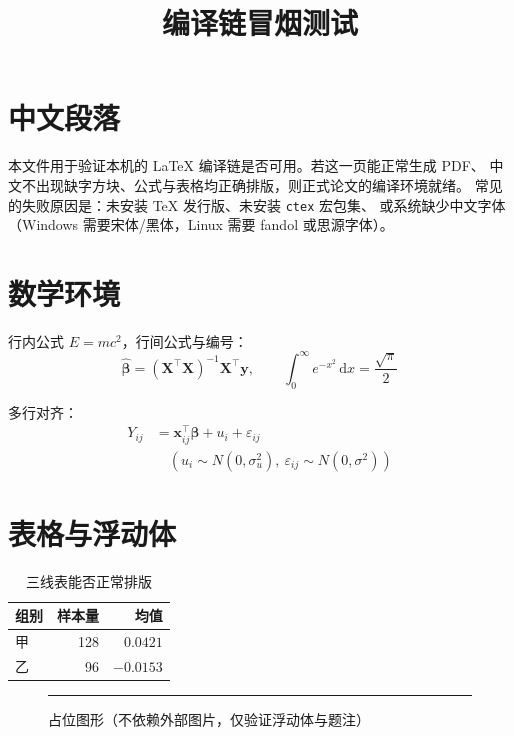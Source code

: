 \documentclass[12pt, a4paper]{ctexart}
\title{编译链冒烟测试}
\author{}
\date{}
\begin{document}
\maketitle

\section{中文段落}

本文件用于验证本机的 \LaTeX{} 编译链是否可用。若这一页能正常生成 PDF、
中文不出现缺字方块、公式与表格均正确排版，则正式论文的编译环境就绪。
常见的失败原因是：未安装 TeX 发行版、未安装 \texttt{ctex} 宏包集、
或系统缺少中文字体（Windows 需要宋体/黑体，Linux 需要 fandol 或思源字体）。

\section{数学环境}

行内公式 $E=mc^2$，行间公式与编号：
\begin{equation}
\hat{\bm\beta} = \left(\bm X^\top \bm X\right)^{-1} \bm X^\top \bm y,
\qquad
\int_{0}^{\infty} e^{-x^2}\,\mathrm{d}x = \frac{\sqrt{\pi}}{2}
\end{equation}

多行对齐：
\begin{align}
Y_{ij} &= \bm x_{ij}^\top \bm\beta + u_i + \varepsilon_{ij}\\
       &\quad (u_i \sim N(0,\sigma_u^2),\ \varepsilon_{ij} \sim N(0,\sigma^2))
\end{align}

\section{表格与浮动体}

\begin{table}[H]\centering
\caption{三线表能否正常排版}
\begin{tabular}{lrr}
\toprule
组别 & 样本量 & 均值 \\
\midrule
甲 & 128 & $0.0421$ \\
乙 & 96  & $-0.0153$ \\
\bottomrule
\end{tabular}
\end{table}

\begin{figure}[H]\centering
\rule{6cm}{3cm}
\caption{占位图形（不依赖外部图片，仅验证浮动体与题注）}
\end{figure}
\end{document}
